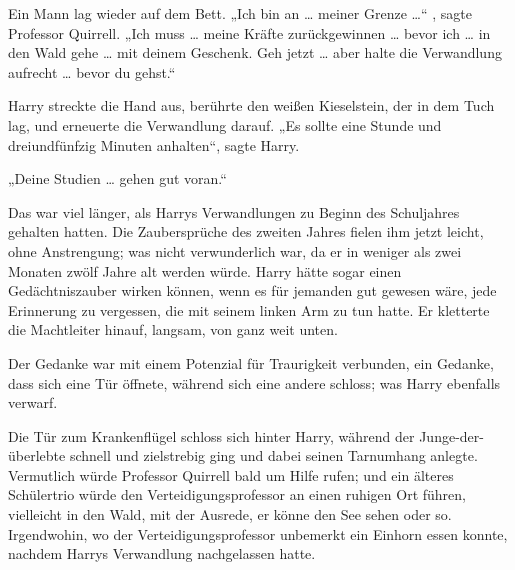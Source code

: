 Ein Mann lag wieder auf dem Bett.
„Ich bin an … meiner Grenze …“ , sagte Professor Quirrell.
„Ich muss … meine Kräfte zurückgewinnen … bevor ich … in den Wald gehe … mit deinem Geschenk. Geh jetzt … aber halte die Verwandlung aufrecht … bevor du gehst.“

Harry streckte die Hand aus, berührte den weißen Kieselstein, der in dem Tuch lag, und erneuerte die Verwandlung darauf.
„Es sollte eine Stunde und dreiundfünfzig Minuten anhalten“, sagte Harry.

„Deine Studien … gehen gut voran.“

Das war viel länger, als Harrys Verwandlungen zu Beginn des Schuljahres gehalten hatten. Die Zaubersprüche des zweiten Jahres fielen ihm jetzt leicht, ohne Anstrengung; was nicht verwunderlich war, da er in weniger als zwei Monaten zwölf Jahre alt werden würde. Harry hätte sogar einen Gedächtniszauber wirken können, wenn es für jemanden gut gewesen wäre, jede Erinnerung zu vergessen, die mit seinem linken Arm zu tun hatte. Er kletterte die Machtleiter hinauf, langsam, von ganz weit unten.

Der Gedanke war mit einem Potenzial für Traurigkeit verbunden, ein Gedanke, dass sich eine Tür öffnete, während sich eine andere schloss; was Harry ebenfalls verwarf.

\later

Die Tür zum Krankenflügel schloss sich hinter Harry, während der Junge-der-überlebte schnell und zielstrebig ging und dabei seinen Tarnumhang anlegte. Vermutlich würde Professor Quirrell bald um Hilfe rufen; und ein älteres Schülertrio würde den Verteidigungsprofessor an einen ruhigen Ort führen, vielleicht in den Wald, mit der Ausrede, er könne den See sehen oder so. Irgendwohin, wo der Verteidigungsprofessor unbemerkt ein Einhorn essen konnte, nachdem Harrys Verwandlung nachgelassen hatte.

